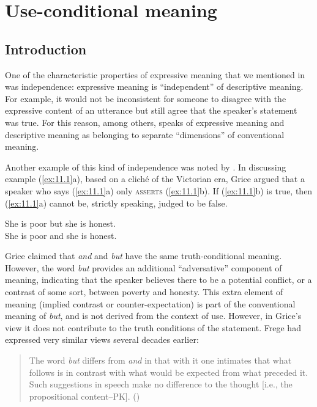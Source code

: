 \chapter{Use-conditional meaning}\label{sec:11}

\section{Introduction}\label{sec:11.1}

One of the characteristic properties of expressive meaning that we mentioned in  was independence: expressive meaning is “independent” of descriptive meaning. For example, it would not be inconsistent for someone to disagree with the expressive content of an utterance but still agree that the speaker’s statement was true. For this reason, among others, \citet{Potts2007c} speaks of expressive meaning and descriptive meaning as belonging to separate “dimensions” of conventional meaning.


Another example of this kind of independence was noted by \citet{Grice1961}. In discussing example (\ref{ex:11.1}a), based on a cliché of the Victorian era, Grice argued that a speaker who says (\ref{ex:11.1}a) only \textsc{asserts} (\ref{ex:11.1}b). If (\ref{ex:11.1}b) is true, then (\ref{ex:11.1}a) cannot be, strictly speaking, judged to be false.



\ea \label{ex:11.1}
\ea She is poor but she is honest.\\
\ex She is poor and she is honest.  \citep[127]{Grice1961}
                       \z
\z


Grice claimed that \textit{and} and \textit{but} have the same truth-conditional meaning. However, the word \textit{but} provides an additional “adversative” component of meaning, indicating that the speaker believes there to be a potential conflict, or a contrast of some sort, between poverty and honesty. This extra element of meaning (implied contrast or counter-expectation) is part of the conventional meaning of \textit{but}, and is not derived from the context of use. However, in Grice’s view it does not contribute to the truth conditions of the statement. Frege had expressed very similar views several decades earlier:


\begin{quote}
The word \textit{but} differs from \textit{and} in that with it one intimates that what follows is in contrast with what would be expected from what preceded it. Such suggestions in speech make no difference to the thought [i.e., the propositional content–PK].   (\citealt{Frege1918})
\end{quote}



